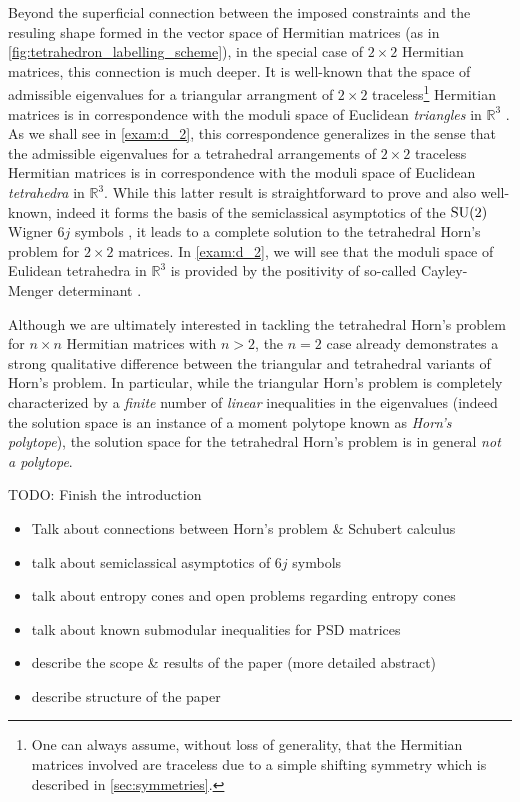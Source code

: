 \documentclass[notitlepage, 10pt]{article}
\begin{document}
Beyond the superficial connection between the imposed constraints and the resuling shape formed in the vector space of Hermitian matrices (as in \cref{fig:tetrahedron_labelling_scheme}), in the special case of $2\times 2$ Hermitian matrices, this connection is much deeper.
It is well-known that the space of admissible eigenvalues for a triangular arrangment of $2\times 2$ traceless\footnote{One can always assume, without loss of generality, that the Hermitian matrices involved are traceless due to a simple shifting symmetry which is described in \cref{sec:symmetries}.} Hermitian matrices is in correspondence with the moduli space of Euclidean \textit{triangles} in $\mathbb R^{3}$ \cite{hausmann1996polygon,freidel2010holomorphic,knutson2000symplectic}.
As we shall see in \cref{exam:d_2}, this correspondence generalizes in the sense that the admissible eigenvalues for a tetrahedral arrangements of $2\times 2$ traceless Hermitian matrices is in correspondence with the moduli space of Euclidean \textit{tetrahedra} in $\mathbb R^{3}$.
While this latter result is straightforward to prove and also well-known, indeed it forms the basis of the semiclassical asymptotics of the $\operatorname{SU}(2)$ Wigner $6j$ symbols \cite{roberts1999classical}, it leads to a complete solution to the tetrahedral Horn's problem for $2\times 2$ matrices.
In \cref{exam:d_2}, we will see that the moduli space of Eulidean tetrahedra in $\mathbb R^3$ is provided by the positivity of so-called Cayley-Menger determinant \cite{sitharam2018handbook}.

Although we are ultimately interested in tackling the tetrahedral Horn's problem for $n\times n$ Hermitian matrices with $n > 2$, the $n=2$ case already demonstrates a strong qualitative difference between the triangular and tetrahedral variants of Horn's problem.
In particular, while the triangular Horn's problem is completely characterized by a \textit{finite} number of \textit{linear} inequalities in the eigenvalues (indeed the solution space is an instance of a moment polytope known as \textit{Horn's polytope}), the solution space for the tetrahedral Horn's problem is in general \textit{not a polytope}.

{\color{red}
    TODO: Finish the introduction
    \begin{itemize}
        \item Talk about connections between Horn's problem \& Schubert calculus
        \item talk about semiclassical asymptotics of $6j$ symbols
        \item talk about entropy cones and open problems regarding entropy cones
        \item talk about known submodular inequalities for PSD matrices
        \item describe the scope \& results of the paper (more detailed abstract)
        \item describe structure of the paper
    \end{itemize}
}
\end{document}
